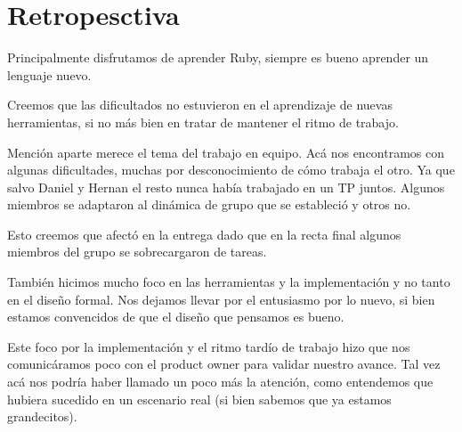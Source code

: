 \section{Retropesctiva}
Principalmente disfrutamos de aprender Ruby, siempre es bueno aprender un lenguaje nuevo.

Creemos que las dificultados no estuvieron en el aprendizaje de nuevas herramientas, si no más bien en tratar de mantener el ritmo de trabajo.

Mención aparte merece el tema del trabajo en equipo. Acá nos encontramos con algunas dificultades, muchas por desconocimiento de cómo trabaja el otro. Ya que salvo Daniel y Hernan el resto nunca había trabajado en un TP juntos. Algunos miembros se adaptaron al dinámica de grupo que se estableció y otros no. 

Esto creemos que afectó en la entrega dado que en la recta final algunos miembros del grupo se sobrecargaron de tareas.

También hicimos mucho foco en las herramientas y la implementación y no tanto en el diseño formal. Nos dejamos llevar por el entusiasmo por lo nuevo, si bien estamos convencidos de que el diseño que pensamos es bueno.

Este foco por la implementación y el ritmo tardío de trabajo hizo que nos comunicáramos poco con el product owner para validar nuestro avance. Tal vez acá nos podría haber llamado un poco más la atención, como entendemos que hubiera sucedido en un escenario real (si bien sabemos que ya estamos grandecitos).
